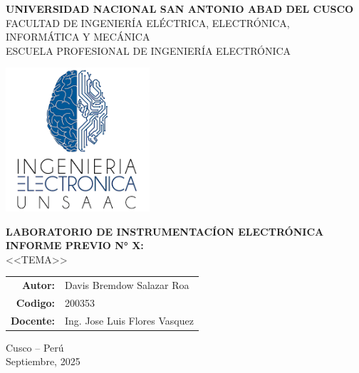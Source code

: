 \begin{titlepage}

  \begin{center}
    \Large{\textbf{UNIVERSIDAD NACIONAL SAN ANTONIO ABAD DEL CUSCO}} \\ 
    \vspace{0.4cm}
    \large{FACULTAD DE INGENIER\'IA EL\'ECTRICA, ELECTR\'ONICA, INFORM\'ATICA Y MEC\'ANICA}\ \\ 
    \vspace{0.1cm} 
    \large{ESCUELA PROFESIONAL DE INGENIER\'IA ELECTR\'ONICA}\ \\ 
	
    \vspace{1.0cm}    
    
    \includegraphics[width=0.4\textwidth]{images/LI-UNSAAC.png} \\


    \vspace{0.8cm}

    \large{\textbf{\textsc{LABORATORIO DE INSTRUMENTAC\'ION ELECTR\'ONICA}}} \\
    \vspace{0.2cm}
    \large{\textbf{\textsc{INFORME PREVIO N° X:}}} \\ 
    
    
    \vspace{0.5cm}
    \large{ \textsc{<<TEMA>>}} \\
    \vspace{1.0cm}
    
    \begin{table}[H]
    	\centering
    	\begin{tabular}{rl}
    		\large{\textbf{Autor:}}   & \large{Davis Bremdow Salazar Roa}  \\
    		\large{\textbf{Codigo:}}   & \large{200353}  \\
    		\large{\textbf{Docente:}} & \large{Ing. Jose Luis Flores Vasquez}
    	\end{tabular}
    \end{table}

	
	\vspace{0.2cm}

    \Large{Cusco -- Per\'u \\
    Septiembre, 2025}
    
  \end{center}
\end{titlepage}
